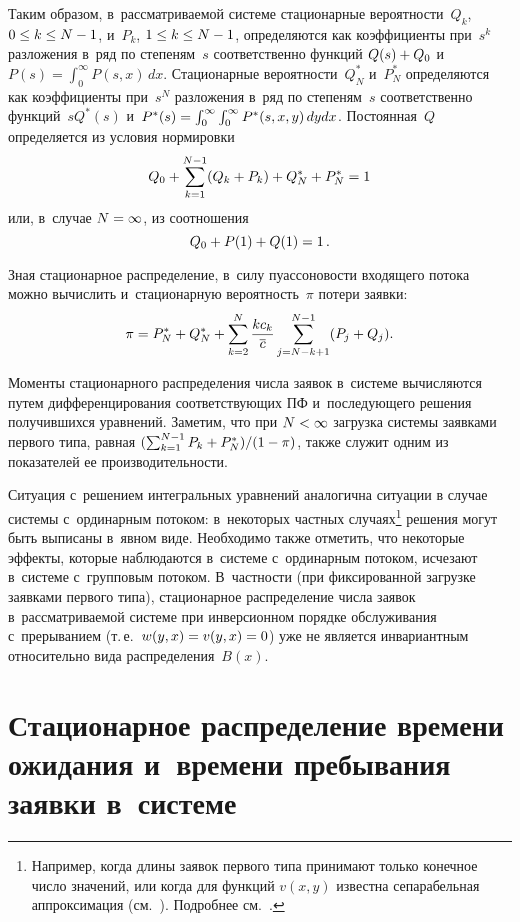 \begin{multicols}{2}
Таким образом, в~рассматриваемой системе стационарные 
вероятности~$Q_k$, ${0 \hm\le k \hm\le N-1}$, и~$P_k$, 
${1 \hm\le k \hm\le N-1}$, определяются
как коэффициенты при~$s^k$ разложения в~ряд по степеням~$s$ 
соответственно функций $Q(s)\hm+Q_0$ 
и~${P(s)=\int\nolimits_0^\infty P(s,x)\,dx}$. 
Стационарные вероятности~$Q^*_N$ и~$P^*_N$ 
определяются как коэффициенты при~$s^N$ разложения в~ряд по степеням~$s$ 
соответственно функций~$sQ^*(s)$
и~$P^*(s)\hm=\int\nolimits_0^\infty \int_0^\infty P^*(s,x,y)\,dydx$.
Постоянная~$Q$ определяется из условия нормировки
$$Q_0\hm+\sum\limits_{k=1}^{N-1} (Q_k+P_k) \hm+Q^*_N \hm+ P^*_N\hm=1$$
или, в~случае ${N\hm=\infty}$, из соотношения 
$${Q_0\hm+P(1)\hm+Q(1)\hm=1}\,.$$


Зная стационарное распределение, в~силу пуассоновости 
входящего потока можно вычислить и~стационарную вероятность~$\pi$ 
потери заявки:
$$
\pi= P^*_{N} + Q^*_{N} + \sum\limits_{k=2}^{N}
\displaystyle\frac{\displaystyle k c_k \mathstrut}{\displaystyle \overline{c}\mathstrut} \sum\limits_{j=N-k+1}^{N-1} (P_{j}+Q_{j}).
$$

\noindent 
Моменты стационарного распределения числа заявок в~системе
вычисляются путем дифференцирования соответствующих ПФ 
и~последующего решения получившихся уравнений.
Заметим, что при $N\hm<\infty$ загрузка системы заявками первого типа, 
равная $(\sum\nolimits_{k=1}^{N-1} P_k \hm+ P^*_N)/(1\hm-\pi)$,
также служит одним из показателей ее производительности.

Ситуация с~решением интегральных уравнений аналогична ситуации
в случае системы с~ординарным потоком: в~некоторых частных 
случаях\footnote{Например, когда длины заявок первого типа принимают 
только конечное число значений, или когда для функций $v(x,y)$ 
известна сепарабельная аппроксимация (см.~\cite{n5,n6,n7,n8}). 
Подробнее см.~\cite[с.~78]{new1}.} решения могут быть выписаны в~явном виде.
Необходимо также отметить, что некоторые эффекты, которые наблюдаются 
в~сис\-те\-ме с~ординарным потоком, исчезают в~системе с~групповым потоком. 
В~част\-ности (при фиксированной загрузке заявками первого типа), 
стационарное распределение числа заявок в~рассматриваемой системе
 при инверсионном порядке обслуживания с~прерыванием (т.\,е.\
  $w(y,x)\hm=v(y,x)\hm=0$) уже не является инвариантным относительно 
  вида распределения~$B(x)$.


\section{Стационарное распределение времени ожидания 
и~времени пребывания заявки в~системе}


\end{multicols}
